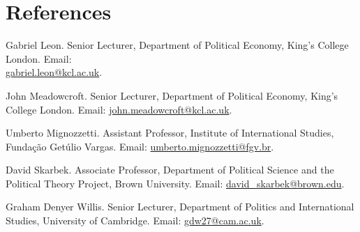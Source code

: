 \documentclass[a4paper]{article}
\renewenvironment{itemize}{
	\begin{list}{}{
			\setlength{\leftmargin}{1.5em}
		}
		}{
	\end{list}
}
\begin{document}
\section*{References}

\begin{itemize}

\item Gabriel Leon. Senior Lecturer, Department of Political Economy, King's College London. Email: \\ \href{mailto:gabriel.leon@kcl.ac.uk}{gabriel.leon@kcl.ac.uk}.
\item John Meadowcroft. Senior Lecturer, Department of Political Economy, King's College London. Email: \href{mailto:john.meadowcroft@kcl.ac.uk}{john.meadowcroft@kcl.ac.uk}.
\item Umberto Mignozzetti. Assistant Professor, Institute of International Studies, Funda\c{c}\~{a}o Get\'{u}lio Vargas. Email: \href{umberto.mignozzetti@fgv.br}{umberto.mignozzetti@fgv.br}.
\item David Skarbek. Associate Professor, Department of Political Science and the Political Theory Project, Brown University. Email: \href{mailto:davidskarbek@gmail.com}{david\_skarbek@brown.edu}.
\item Graham Denyer Willis. Senior Lecturer, Department of Politics and International Studies, University of Cambridge. Email: \href{mailto:gdw27@cam.ac.uk}{gdw27@cam.ac.uk}.
	\end{itemize}

	\bigskip


	
\end{document}
